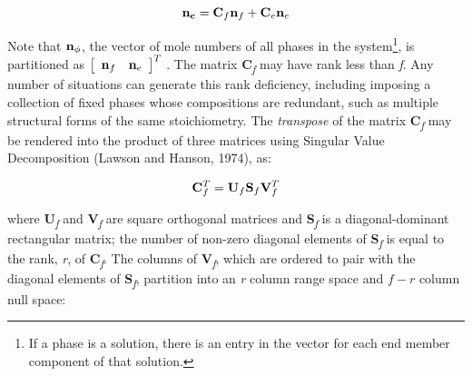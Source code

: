 \documentclass[11pt, titlepage, twoside]{article}
\begin{document}
\begin{MPEquation}[!ht]
\begin{equation}
{\bf{n}_c} = {{\bf{C}}_f}{{\bf{n}}_f} + {{\bf{C}}_e}{{\bf{n}}_e}
\end{equation}
\label{MPEquationElement:5310787F-DB88-4416-DB57-A6919AB1D781}
\end{MPEquation}
Note that ${{\bf{n}}_\phi }$, the vector of mole numbers of all phases in the system\footnote{If a phase is a solution, there is an entry in the vector for each end member component of that solution.

}, is partitioned as ${\left[ {\begin{array}{*{20}{c}}
{{{\bf{n}}_f}}&{{{\bf{n}}_e}}
\end{array}} \right]^T}$ . The matrix \textbf{C}\textsubscript{\emph{f}} may have rank less than \emph{f}. Any number of situations can generate this rank deficiency, including imposing a collection of fixed phases whose compositions are redundant, such as multiple structural forms of the same stoichiometry. The \emph{transpose} of the matrix \textbf{C}\textsubscript{\emph{f}} may be rendered into the product of three matrices using Singular Value Decomposition (Lawson and Hanson, 1974), as:


\begin{MPEquation}[!ht]
\begin{equation}
{\bf{C}}_f^T = {{\bf{U}}_f}{{\bf{S}}_f}{\bf{V}}_f^T
\end{equation}
\label{MPEquationElement:3504A45D-6B6E-4D72-ACE1-B77CB660F8F7}
\end{MPEquation}
where \textbf{U}\textsubscript{\emph{f}} and \textbf{V}\textsubscript{\emph{f}} are square orthogonal matrices and \textbf{S}\textsubscript{\emph{f}} is a diagonal-dominant rectangular matrix; the number of non-zero diagonal elements of \textbf{S}\emph{\textsubscript{f}} is equal to the rank, \emph{r}, of \textbf{C}\textsubscript{\emph{f}}. The columns of \textbf{V}\textsubscript{\emph{f}}, which are ordered to pair with the diagonal elements of \textbf{S}\textsubscript{\emph{f}}, partition into an \emph{r} column range space and $f - r$ column null space:
\end{document}
